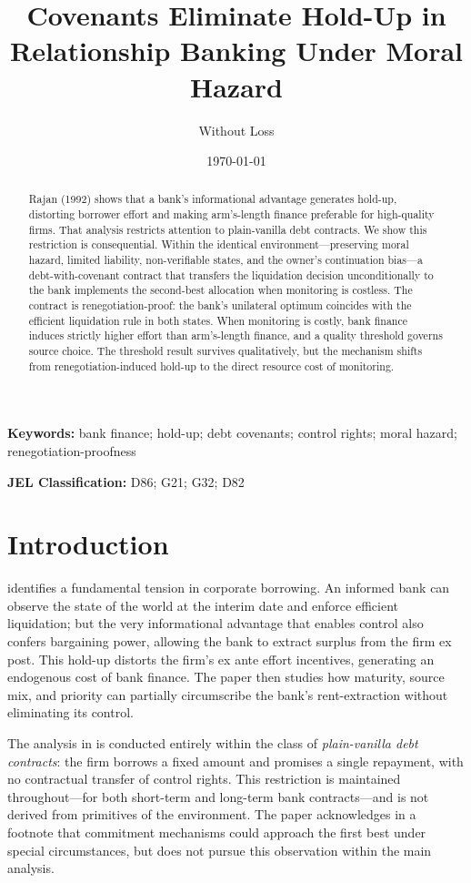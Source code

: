 \documentclass[12pt,a4paper]{article}
\title{Covenants Eliminate Hold-Up in Relationship Banking Under Moral Hazard}
\author{Without Loss}
\date{\today}
\theoremstyle{plain}
\theoremstyle{definition}
\theoremstyle{remark}
\begin{document}
\maketitle

\begin{abstract}
\noindent Rajan (1992) shows that a bank's informational advantage generates hold-up, distorting borrower effort and making arm's-length finance preferable for high-quality firms. That analysis restricts attention to plain-vanilla debt contracts. We show this restriction is consequential. Within the identical environment---preserving moral hazard, limited liability, non-verifiable states, and the owner's continuation bias---a debt-with-covenant contract that transfers the liquidation decision unconditionally to the bank implements the second-best allocation when monitoring is costless. The contract is renegotiation-proof: the bank's unilateral optimum coincides with the efficient liquidation rule in both states. When monitoring is costly, bank finance induces strictly higher effort than arm's-length finance, and a quality threshold governs source choice. The threshold result survives qualitatively, but the mechanism shifts from renegotiation-induced hold-up to the direct resource cost of monitoring.
\end{abstract}

\medskip
\noindent \textbf{Keywords:} bank finance; hold-up; debt covenants; control rights; moral hazard; renegotiation-proofness

\smallskip
\noindent \textbf{JEL Classification:} D86; G21; G32; D82

\bigskip

\section{Introduction}
\label{sec:intro}

\citet{Rajan1992} identifies a fundamental tension in corporate borrowing. An informed
bank can observe the state of the world at the interim date and enforce efficient
liquidation; but the very informational advantage that enables control also confers
bargaining power, allowing the bank to extract surplus from the firm ex post. This
hold-up distorts the firm's ex ante effort incentives, generating an endogenous cost of
bank finance. The paper then studies how maturity, source mix, and priority can
partially circumscribe the bank's rent-extraction without eliminating its control.

The analysis in \citet{Rajan1992} is conducted entirely within the class of
\emph{plain-vanilla debt contracts}: the firm borrows a fixed amount and promises a
single repayment, with no contractual transfer of control rights. This restriction is
maintained throughout---for both short-term and long-term bank contracts---and is
not derived from primitives of the environment. The paper acknowledges in a footnote
that commitment mechanisms could approach the first best under special circumstances,
but does not pursue this observation within the main analysis.
\end{document}
